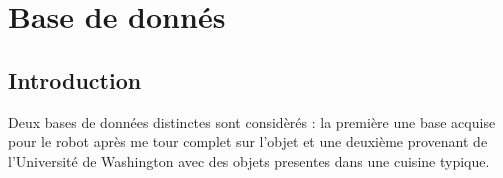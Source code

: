 \chapter{Base de donnés}

\section{Introduction}

Deux bases de données distinctes sont considèrés : la première une base acquise pour le robot après me tour complet sur l'objet et une deuxième provenant de l'Université de Washington avec des objets presentes dans une cuisine typique. 
